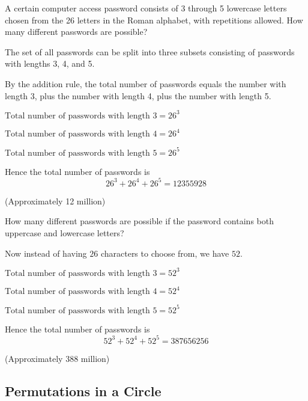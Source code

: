 \documentclass[11pt,a4paper]{book}
\begin{document}
\begin{example}

A certain computer access password consists of 3 through 5 lowercase
letters chosen from the 26 letters in the Roman alphabet, with repetitions
allowed. How many different passwords are possible?

The set of all passwords can be split into three subsets consisting
of passwords with lengths 3, 4, and 5.

By the addition rule, the total number of passwords equals the number
with length 3, plus the number with length 4, plus the number with
length 5.

$\text{Total number of passwords with length 3}=26^{3}$

$\text{Total number of passwords with length 4}=26^{4}$

$\text{Total number of passwords with length 5}=26^{5}$

Hence the total number of passwords is
\[
26^{3}+26^{4}+26^{5}=12355928
\]

(Approximately 12 million)

How many different passwords are possible if the password contains
both uppercase and lowercase letters?

Now instead of having $26$ characters to choose from, we have $52$.

$\text{Total number of passwords with length 3}=52^{3}$

$\text{Total number of passwords with length 4}=52^{4}$

$\text{Total number of passwords with length 5}=52^{5}$

Hence the total number of passwords is
\[
52^{3}+52^{4}+52^{5}=387656256
\]

(Approximately 388 million)

\end{example}

\subsection{Permutations in a Circle }
\end{document}
